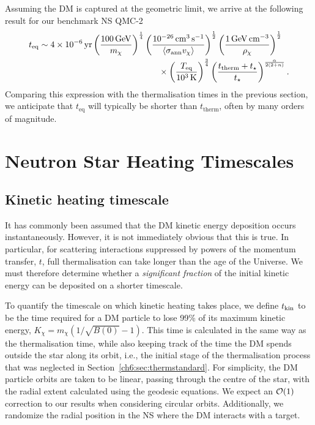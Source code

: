 Assuming the DM is captured at the geometric limit, we arrive at the following result for our benchmark NS QMC-2
\begin{equation}
  \begin{split}
    t_{\rm eq}  &\sim  4\times10^{-6}\yr\left(\frac{100\GeV}{m_\chi}\right)^{\frac{1}{4}}\left(\frac{10^{-26}\cm^3 \s^{-1}}{\langle\sigma_\text{ann} v_\chi\rangle}\right)^{\frac{1}{2}} \left(\frac{1\GeV\cm^{-3}}{\rho_\chi}\right)^{\frac{1}{2}}
     \\&\hspace*{14em} \times \left(\frac{T_{\rm eq}}{10^3\K}\right)^{\frac{3}{4}} 
    \left(\frac{t_{\rm therm}+\tstar}{\tstar}\right)^{\frac{\alpha}{2(2+n)}}.
  \end{split}
\end{equation}
Comparing this expression with the thermalisation times in the previous section, we anticipate that  $t_\text{eq}$ will typically be shorter than $t_\text{therm}$, often by many orders of magnitude.




\section{Neutron Star Heating Timescales}
\label{ch6:sec:results}



\subsection{Kinetic heating timescale}
\label{ch6:subsec:KinHeating}


It has commonly been assumed that the DM kinetic energy deposition occurs instantaneously. However, it is not immediately obvious that this is true. In particular, for scattering interactions suppressed by powers of the momentum transfer, $t$, full thermalisation can take longer than the age of the Universe. We must therefore determine whether a {\it significant fraction} of the initial kinetic energy can be deposited on a shorter timescale.



To quantify the timescale on which kinetic heating takes place, we define $t_{\rm kin}$ to be the time required for a DM particle to lose 99\% of its maximum kinetic energy, $K_\chi = m_\chi (1/\sqrt{B(0)} - 1)$.  
This time is calculated in the same way as the thermalisation time, while also keeping track of the time the DM spends outside the star along its orbit, i.e., the initial stage of the thermalisation process that was neglected in Section~\ref{ch6:sec:thermstandard}. For simplicity, the DM particle orbits are taken to be linear, passing through the centre of the star, with the radial extent calculated using the geodesic equations. We expect an ${\cal O}(1)$ correction to our results when considering circular orbits.
Additionally, we randomize the radial position in the NS where the DM interacts with a target. 

